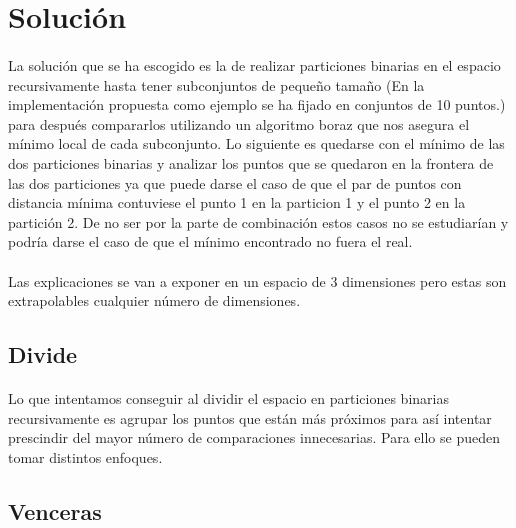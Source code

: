 \documentclass{article}
\begin{document}
\section{Solución}

	\paragraph{}
	La solución que se ha escogido es la de realizar particiones binarias en el espacio recursivamente hasta tener subconjuntos de pequeño tamaño (En la implementación propuesta como ejemplo se ha fijado en conjuntos de 10 puntos.) para después compararlos utilizando un algoritmo boraz que nos asegura el mínimo local de cada subconjunto. Lo siguiente es quedarse con el mínimo de las dos particiones binarias y analizar los puntos que se quedaron en la frontera de las dos particiones ya que puede darse el caso de que el par de puntos con distancia mínima contuviese el punto 1 en la particion 1 y el punto 2 en la partición 2. De no ser por la parte de combinación estos casos no se estudiarían y podría darse el caso de que el mínimo encontrado no fuera el real.

	\paragraph{}
	Las explicaciones se van a exponer en un espacio de 3 dimensiones pero estas son extrapolables cualquier número de dimensiones.

	\subsection{Divide}
		\paragraph{}
		Lo que intentamos conseguir al dividir el espacio en particiones binarias recursivamente es agrupar los puntos que están más próximos para así intentar prescindir del mayor número de comparaciones innecesarias. Para ello se pueden tomar distintos enfoques.
		



	\subsection{Venceras}
		\paragraph{}
\end{document}
